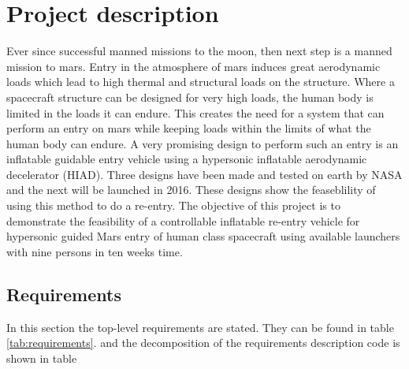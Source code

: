\section{Project description}\label{cha:project_description}%
Ever since successful manned missions to the moon, then next step is a manned mission to mars. Entry in the atmosphere of mars induces great aerodynamic loads which lead to high thermal and structural loads on the structure. Where a spacecraft structure can be designed for very high loads, the human body is limited in the loads it can endure. This creates the need for a system that can perform an entry on mars while keeping loads within the limits of what the human body can endure. A very promising design to perform such an entry is an inflatable guidable entry vehicle using a hypersonic inflatable aerodynamic decelerator (HIAD). Three designs have been made and tested on earth by NASA and the next will be launched in 2016. \cite{irve,irve2,irve3,thor} These designs show the feaseblility of using this method to do a re-entry. The objective of this project is to demonstrate the feasibility of a controllable inflatable re-entry vehicle for hypersonic guided Mars entry of human class spacecraft using available launchers with nine persons in ten weeks time.

\subsection{Requirements}
In this section the top-level requirements are stated. They can be found in table \ref{tab:requirements}. and the decomposition of the requirements description code is shown in table

